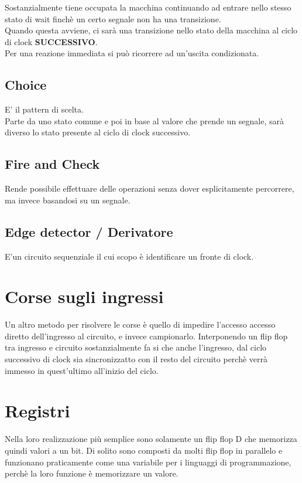 \documentclass[a4paper]{book}
\begin{document}
Sostanzialmente tiene occupata la macchina continuando ad entrare nello stesso stato di wait finchè un certo segnale non ha una transizione.\\
Quando questa avviene, ci sarà una transizione nello stato della macchina al ciclo di clock \textbf{SUCCESSIVO}.\\
Per una reazione immediata si può ricorrere ad un'uscita condizionata. 
\subsection*{Choice}

E' il pattern di scelta.\\
Parte da uno stato comune e poi in base al valore che prende un segnale, sarà diverso lo stato presente al ciclo di clock successivo.

\subsection*{Fire and Check}

Rende possibile effettuare delle operazioni senza dover esplicitamente percorrere, ma invece basandosi su un segnale.


\subsection*{Edge detector / Derivatore}

E'un circuito sequenziale il cui scopo è identificare un fronte di clock.

\section{Corse sugli ingressi}




Un altro metodo per risolvere le corse è quello di impedire l'accesso accesso diretto  dell'ingresso al circuito, e invece campionarlo.
Interponendo un flip flop tra ingresso e circuito sostanzialmente fa si che anche l'ingresso, dal ciclo successivo di clock sia sincronizzatto con il resto del circuito perchè verrà immesso in quest'ultimo all'inizio del ciclo.

\section{Registri}

Nella loro realizzazione più semplice sono solamente un flip flop D che memorizza quindi valori a un bit.
Di solito sono composti da molti flip flop in parallelo e funzionano praticamente come una variabile per i linguaggi di programmazione, perchè la loro funzione è memorizzare un valore.
\end{document}
